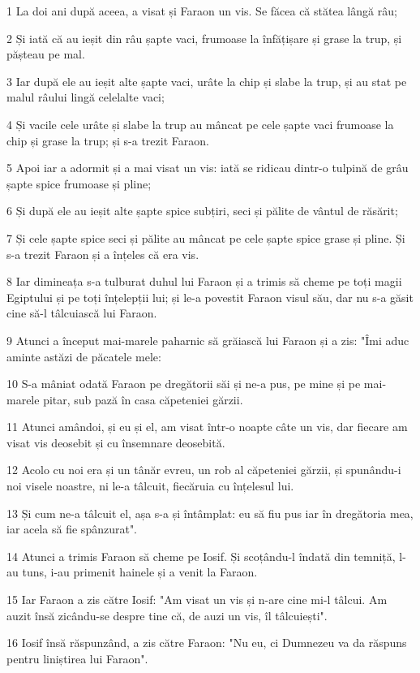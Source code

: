\par 1 La doi ani după aceea, a visat și Faraon un vis. Se făcea că stătea lângă râu;
\par 2 Și iată că au ieșit din râu șapte vaci, frumoase la înfățișare și grase la trup, și pășteau pe mal.
\par 3 Iar după ele au ieșit alte șapte vaci, urâte la chip și slabe la trup, și au stat pe malul râului lingă celelalte vaci;
\par 4 Și vacile cele urâte și slabe la trup au mâncat pe cele șapte vaci frumoase la chip și grase la trup; și s-a trezit Faraon.
\par 5 Apoi iar a adormit și a mai visat un vis: iată se ridicau dintr-o tulpină de grâu șapte spice frumoase și pline;
\par 6 Și după ele au ieșit alte șapte spice subțiri, seci și pălite de vântul de răsărit;
\par 7 Și cele șapte spice seci și pălite au mâncat pe cele șapte spice grase și pline. Și s-a trezit Faraon și a înțeles că era vis.
\par 8 Iar dimineața s-a tulburat duhul lui Faraon și a trimis să cheme pe toți magii Egiptului și pe toți înțelepții lui; și le-a povestit Faraon visul său, dar nu s-a găsit cine să-l tâlcuiască lui Faraon.
\par 9 Atunci a început mai-marele paharnic să grăiască lui Faraon și a zis: "Îmi aduc aminte astăzi de păcatele mele:
\par 10 S-a mâniat odată Faraon pe dregătorii săi și ne-a pus, pe mine și pe mai-marele pitar, sub pază în casa căpeteniei gărzii.
\par 11 Atunci amândoi, și eu și el, am visat într-o noapte câte un vis, dar fiecare am visat vis deosebit și cu însemnare deosebită.
\par 12 Acolo cu noi era și un tânăr evreu, un rob al căpeteniei gărzii, și spunându-i noi visele noastre, ni le-a tâlcuit, fiecăruia cu înțelesul lui.
\par 13 Și cum ne-a tâlcuit el, așa s-a și întâmplat: eu să fiu pus iar în dregătoria mea, iar acela să fie spânzurat".
\par 14 Atunci a trimis Faraon să cheme pe Iosif. Și scoțându-l îndată din temniță, l-au tuns, i-au primenit hainele și a venit la Faraon.
\par 15 Iar Faraon a zis către Iosif: "Am visat un vis și n-are cine mi-l tâlcui. Am auzit însă zicându-se despre tine că, de auzi un vis, îl tâlcuiești".
\par 16 Iosif însă răspunzând, a zis către Faraon: "Nu eu, ci Dumnezeu va da răspuns pentru liniștirea lui Faraon".
